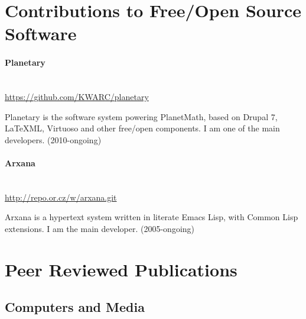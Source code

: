 \documentclass[12pt,article]{memoir}
\begin{document}
\section*{Contributions to Free/Open Source Software}

\paragraph{Planetary}  \hspace{.1in} \\
\url{https://github.com/KWARC/planetary} \smallskip

Planetary is the software system powering PlanetMath, based
on Drupal 7, \LaTeX ML, Virtuoso and other free/open components.  I am
one of the main developers. (2010-ongoing)

\paragraph{Arxana}  \hspace{.1in} \\
\url{http://repo.or.cz/w/arxana.git} \smallskip

Arxana is a hypertext system written in literate Emacs Lisp,
with Common Lisp extensions.  I am the main developer. (2005-ongoing)

\section*{Peer Reviewed Publications}

\subsection*{Computers and Media}
\end{document}
